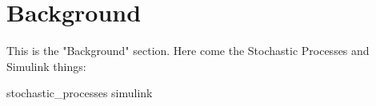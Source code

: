 \section{Background}

This is the "Background" section. Here come the Stochastic Processes and Simulink things:

{stochastic_processes}
{simulink}
